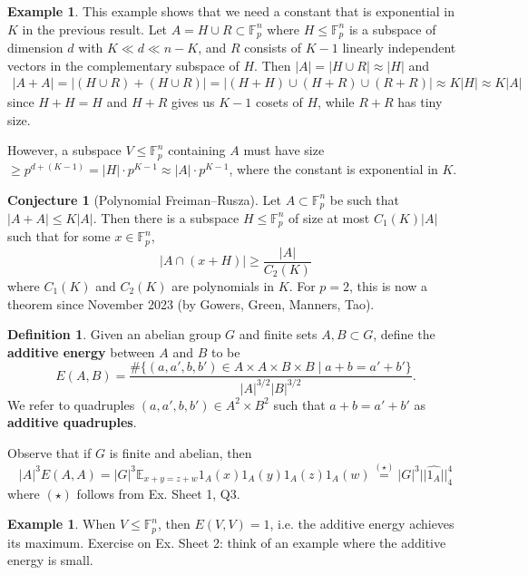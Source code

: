 \documentclass{article}
\theoremstyle{definition}
\newtheorem{conj}[theorem]{Conjecture}
\newtheorem{example}[theorem]{Example}
\newtheorem{defn}[theorem]{Definition}
\begin{document}
\begin{example}
    This example shows that we need a constant that is exponential in $K$ in the previous result. Let $A = H \cup R \subset \mathbb{F}_p^n$ where $H \le \mathbb{F}_p^n$ is a subspace of dimension $d$ with $K \ll d \ll n-K$, and $R$ consists of $K-1$ linearly independent vectors in the complementary subspace of $H$. Then $\left|A\right| = \left|H \cup R\right| \approx \left|H\right|$ and 
    \begin{align*}
        \left|A+A\right| = \left|(H\cup R)+(H\cup R)\right| = \left|(H+H)\cup(H+R)\cup(R+R)\right| \approx K\left|H\right| \approx K\left|A\right|
    \end{align*}
    since $H+H=H$ and $H+R$ gives us $K-1$ cosets of $H$, while $R+R$ has tiny size.
    \vspace{1mm}
     
    However, a subspace $V \le \mathbb{F}_p^n$ containing $A$ must have size $\ge p^{d+(K-1)} = \left|H\right|\cdot p^{K-1} \approx \left|A\right|\cdot p^{K-1}$,
    where the constant is exponential in $K$.
\end{example}
\begin{conj}[Polynomial Freiman--Rusza]
    Let $A \subset \mathbb{F}_p^n$ be such that $\left|A+A\right|\le K\left|A\right|$. Then there is a subspace $H \le \mathbb{F}_p^n$ of size at most $C_1(K)\left|A\right|$ such that for some $x \in \mathbb{F}_p^n$, $$\left|A \cap (x+H)\right| \ge \frac{\left|A\right|}{C_2(K)}$$ where $C_1(K)$ and $C_2(K)$ are polynomials in $K$. For $p=2$, this is now a theorem since November 2023 (by Gowers, Green, Manners, Tao).
\end{conj}
\begin{defn}
    Given an abelian group $G$ and finite sets $A,B \subset G$, define the \textbf{additive energy} between $A$ and $B$ to be \[
    E(A,B) = \frac{\#\{(a,a',b,b') \in A \times A \times B \times B \mid a+b=a'+b'\}}{\left|A\right|^{3/2}\left|B\right|^{3/2}}.
    \]
    We refer to quadruples $(a,a',b,b') \in A^2 \times B^2$ such that $a+b=a'+b'$ as \textbf{additive quadruples}.
\end{defn}
Observe that if $G$ is finite and abelian, then $$\left|A\right|^3E(A,A) = \left|G\right|^3 \mathbb{E}_{x+y=z+w}1_A(x)1_A(y)1_A(z)1_A(w) \stackrel{(\star)}{=} \left|G\right|^3 ||\widehat{1_A}||_4^4$$
where $(\star)$ follows from Ex. Sheet 1, Q3.
\begin{example}
    When $V \le \mathbb{F}_p^n$, then $E(V,V)=1$, i.e. the additive energy achieves its maximum. Exercise on Ex. Sheet 2: think of an example where the additive energy is small.
\end{example}
\end{document}
